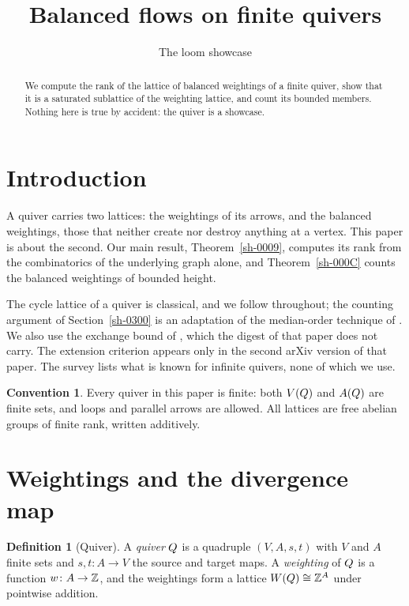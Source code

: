\documentclass[11pt]{amsart}
\title{Balanced flows on finite quivers}
\author{The loom showcase}
\theoremstyle{plain}
\theoremstyle{definition}
\newtheorem{definition}[theorem]{Definition}
\newtheorem{convention}[theorem]{Convention}
\theoremstyle{remark}
\begin{document}
\maketitle

\begin{abstract}
We compute the rank of the lattice of balanced weightings of a finite quiver, show that it is a saturated sublattice of the weighting lattice, and count its bounded members. Nothing here is true by accident: the quiver is a showcase.
\end{abstract}

\section{Introduction}\label{sh-0100}

A quiver carries two lattices: the weightings of its arrows, and the balanced weightings, those that neither create nor destroy anything at a vertex. This paper is about the second. Our main result, Theorem~\ref{sh-0009}, computes its rank from the combinatorics of the underlying graph alone, and Theorem~\ref{sh-000C} counts the balanced weightings of bounded height.

The cycle lattice of a quiver is classical, and we follow \cite[Proposition 2.1]{Arden24} throughout; the counting argument of Section~\ref{sh-0300} is an adaptation of the median-order technique of \cite[Theorem 2.3]{Bellamy19}. We also use the exchange bound of \cite[Lemma 5.9]{Arden24}, which the digest of that paper does not carry. The extension criterion \cite[Theorem 5.1]{Arden24} appears only in the second arXiv version of that paper. The survey \cite{Cortez07} lists what is known for infinite quivers, none of which we use.

\begin{convention}\label{sh-0001}
Every quiver in this paper is finite: both $V(Q)$ and $A(Q)$ are finite sets, and loops and parallel arrows are allowed. All lattices are free abelian groups of finite rank, written additively.
\end{convention}


\section{Weightings and the divergence map}\label{sh-0200}

\begin{definition}[Quiver]\label{sh-0002}
A \emph{quiver} $Q$ is a quadruple $(V, A, s, t)$ with $V$ and $A$ finite sets and $s, t \colon A \to V$ the source and target maps. A \emph{weighting} of $Q$ is a function $w \colon A \to \mathbb{Z}$, and the weightings form a lattice $W(Q) \cong \mathbb{Z}^{A}$ under pointwise addition.
\end{definition}
\end{document}
